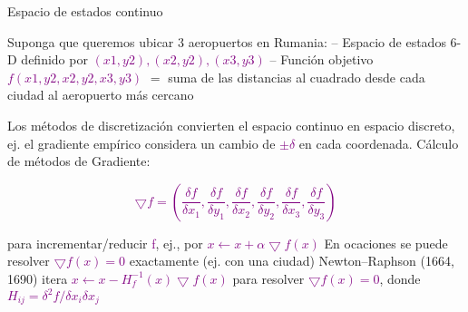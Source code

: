 
\begin{frame}{Espacio de estados continuo}
    \begin{right}
    
    Suponga que queremos ubicar 3 aeropuertos en Rumania:\newline
    \hspace*{1em}– Espacio de estados 6-D definido por \textcolor{Purple}{\((x1, y2), (x2, y2), (x3, y3)\)}\newline
    \hspace*{1em}– Función objetivo \textcolor{Purple}{$f(x1, y2, x2, y2, x3, y3) $} $ = $
    \hspace*{2em}suma de las distancias al cuadrado desde cada ciudad al aeropuerto más cercano
    
    Los métodos de \textcolor{blue(pigment)}{discretización} convierten el espacio continuo en espacio discreto,
    ej. el \textcolor{blue(pigment)}{gradiente empírico} considera un cambio de \textcolor{Purple}{$\pm \delta$} 
    en cada coordenada.\newline
    Cálculo de métodos de \textcolor{blue(pigment)}{Gradiente}:
    \end{right}
     \textcolor{Purple}{\[
      	\bigtriangledown f = (\frac{\delta f}{ \delta x_{1}},\frac{\delta f}{ \delta y_{1}},\frac{\delta f}{ \delta x_{2}},\frac{\delta f}{ \delta y_{2}},\frac{\delta f}{ \delta x_{3}},\frac{\delta f}{ \delta y_{3}})
    \]}
    \begin{right}
    
    para incrementar/reducir \textcolor{Purple}{f}, ej., por \textcolor{Purple}{$x \leftarrow x +  \alpha \bigtriangledown f(x)$}\newline
    En ocaciones se puede resolver \textcolor{Purple}{$\bigtriangledown f(x) = 0$} exactamente (ej. con una ciudad)
\textcolor{blue(pigment)}{Newton–Raphson} (1664, 1690) itera \textcolor{Purple}{$x \leftarrow x - H_{f}^{-1}(x) \bigtriangledown f(x)$} 
para resolver \textcolor{Purple}{$\bigtriangledown f(x) = 0$}, donde \textcolor{Purple}{$H_{ij} =  \delta ^{2} f/ \delta x_{i} \delta x_{j}$}
    \end{right}
\end{frame}
